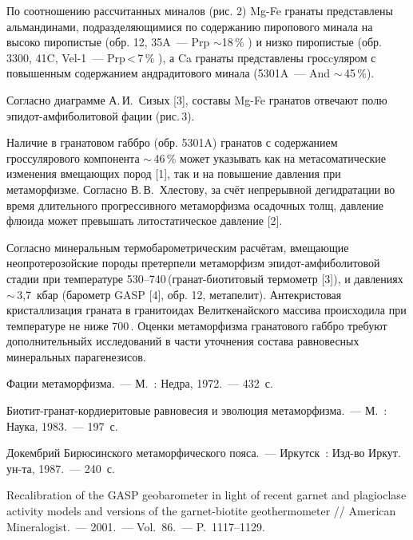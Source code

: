 

По соотношению рассчитанных миналов (рис. 2) Mg-Fe гранаты представлены альмандинами, подразделяющимися по содержанию пиропового минала на высоко пиропистые (обр. 12, 35A~--- Prp $\sim$18\,\%  ) и низко пиропистые (обр. 3300, 41C, Vel-1~--- Prp\,<\,7\,\% ), а Ca гранаты представлены гросcуляром с повышенным содержанием андрадитового минала (5301A~--- And $\sim$\,45\,\%).

Согласно диаграмме А.\,И.~Сизых [3], составы Mg-Fe гранатов отвечают полю эпидот-амфиболитовой фации (рис.\,3).



Наличие в гранатовом габбро (обр. 5301A) гранатов с содержанием гроссулярового компонента $\sim$\,46\,\%  может указывать как на метасоматические изменения  вмещающих пород [1], так и на повышение давления при метаморфизме.  Согласно В.\,В.~Хлестову, за счёт  непрерывной  дегидратации во время длительного прогрессивного метаморфизма осадочных толщ, давление флюида  может превышать литостатическое давление [2].

Согласно минеральным термобарометрическим расчётам,  вмещающие неопротерозойские породы претерпели метаморфизм эпидот-амфиболитовой стадии при температуре 530--740\,\dgc (гранат-биотитовый термометр [3]), и давлениях $\sim$\,3,7~кбар  (барометр GASP [4], обр. 12, метапелит). Антекристовая кристаллизация граната в гранитоидах Велиткенайского массива происходила при температуре не ниже 700\,\dgc. Оценки метаморфизма гранатового габбро требуют дополнительныйх исследований в части уточнения состава равновесных минеральных парагенезисов.
\clearpage
\begin{thebibliography}{99}

\bibitem{} Фации метаморфизма.~--- М.~: Недра, 1972.~--- 432~с.

\bibitem{} Биотит-гранат-кордиеритовые равновесия и эволюция метаморфизма.~--- М.~: Наука, 1983.~--- 197~с.

\bibitem{} Докембрий Бирюсинского метаморфического пояса.~--- Иркутск~: Изд-во Иркут. ун-та, 1987.~--- 240~с.


\bibitem{} Recalibration of the GASP geobarometer in light of recent garnet and plagioclase activity models and versions of the garnet-biotite geothermometer // American Mineralogist.~--- 2001.~--- Vol.~86.~--- P.~1117--1129.
\end{thebibliography}
\thispagestyle{empty}
